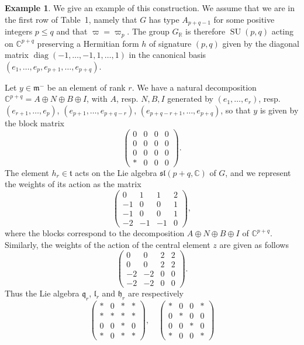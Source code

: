 \documentclass[10pt]{article}
\theoremstyle{definition}
\newtheorem{example}[theorem]{Example}
\numberwithin{equation}{section}
\begin{document}
\begin{example}
We give an example of this construction. We assume that we are in the first row of Table~1, namely that $G$ has type $A_{p+q-1}$ for some positive integers $p\leqslant q$ and that $\varpi=\varpi_p$. The group $G_{\mathbb R}$ is therefore $\operatorname{SU}(p,q)$ acting on $\mathbb C^{p+q}$ preserving a Hermitian form $h$ of signature $(p,q)$ given by the diagonal matrix $\operatorname{diag}(-1,\ldots,-1,1,\ldots,1)$ in the canonical basis $(e_1,\ldots,e_p,e_{p+1},\ldots,e_{p+q})$.

Let $y\in\mathfrak m^-$ be an element of rank $r$. We have a natural decomposition $\mathbb C^{p+q}=A\oplus N\oplus B\oplus I$, with $A$, resp. $N,B,I$ generated by $(e_1,\ldots,e_r)$, resp. $(e_{r+1},\ldots,e_p)$, $(e_{p+1},\ldots,e_{p+q-r})$, $(e_{p+q-r+1},\ldots,e_{p+q})$, so that $y$ is given by the block matrix
\[
\begin{pmatrix}0&0&0&0\\0&0&0&0\\0&0&0&0\\ *&0&0&0\end{pmatrix}.
\]
The element $h_r\in\mathfrak t$ acts on the Lie algebra $\mathfrak{sl}(p+q,\mathbb C)$ of $G$, and we represent the weights of its action as the matrix
\[
\begin{pmatrix}0&1&1&2\\-1&0&0&1\\-1&0&0&1\\-2&-1&-1&0\end{pmatrix},
\]
where the blocks correspond to the decomposition $A\oplus N\oplus B\oplus I$ of $\mathbb C^{p+q}$. Similarly, the weights of the action of the central element $z$ are given as follows
\[
\begin{pmatrix}0&0&2&2\\0&0&2&2\\-2&-2&0&0\\-2&-2&0&0\end{pmatrix}.
\]
Thus the Lie algebra $\mathfrak q_r$, $\mathfrak l_r$ and $\mathfrak h_r$ are respectively
\[
\begin{pmatrix}*&0&*&*\\{*}&*&*&*\\0&0&*&0\\{*}&0&*&*\end{pmatrix},\quad
\begin{pmatrix}*&0&0&*\\0&*&0&0\\0&0&*&0\\{*}&0&0&*\end{pmatrix}
\]
\end{example}
\end{document}
